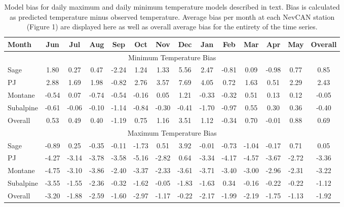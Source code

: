 \documentclass{ametsoc}
\begin{document}
\begin{table}[t]
\caption{Model bias for daily maximum and daily minimum temperature models described in text. Bias is calculated as predicted temperature minus observed temperature. Average bias per month at each NevCAN station (Figure 1) are displayed here as well as overall average bias for the entirety of the time series.}
\begin{center}
\begin{tabular}{lccccccccccccc}
\hline\hline
Month     & Jun   & Jul   & Aug   & Sep   & Oct   & Nov   & Dec   & Jan   & Feb   & Mar   & Apr   & May   & Overall \\
\hline
\multicolumn{14}{c}{Minimum Temperature Bias}                                                                       \\
Sage      & 1.80  & 0.27  & 0.47  & -2.24 & 1.24  & 1.33  & 5.56  & 2.47  & -0.81 & 0.09  & -0.98 & 0.77  & 0.85    \\
PJ        & 2.88  & 1.69  & 1.98  & -0.82 & 2.76  & 3.57  & 7.69  & 4.05  & 0.72  & 1.63  & 0.51  & 2.29  & 2.43    \\
Montane   & -0.54 & 0.07  & -0.74 & -0.54 & -0.16 & 0.05  & 1.21  & -0.33 & -0.32 & 0.51  & 0.13  & 0.12  & -0.05   \\
Subalpine & -0.61 & -0.06 & -0.10 & -1.14 & -0.84 & -0.30 & -0.41 & -1.70 & -0.97 & 0.55  & 0.30  & 0.36  & -0.40   \\
Overall   & 0.53  & 0.49  & 0.40  & -1.19 & 0.75  & 1.16  & 3.51  & 1.12  & -0.34 & 0.70  & -0.01 & 0.88  & 0.69    \\
\multicolumn{14}{c}{Maximum Temperature Bias}                                                                       \\
Sage      & -0.89 & 0.25  & -0.35 & -0.11 & -1.73 & 0.51  & 3.92  & -0.01 & -0.73 & -1.04 & -0.17 & 0.71  & 0.05    \\
PJ        & -4.27 & -3.14 & -3.78 & -3.58 & -5.16 & -2.82 & 0.64  & -3.34 & -4.17 & -4.57 & -3.67 & -2.72 & -3.36   \\
Montane   & -4.75 & -3.10 & -3.86 & -2.40 & -3.37 & -2.33 & -3.61 & -3.71 & -3.40 & -3.00 & -2.96 & -2.31 & -3.22   \\
Subalpine & -3.55 & -1.55 & -2.36 & -0.32 & -1.62 & -0.05 & -1.83 & -1.63 & 0.34  & -0.16 & -0.22 & -0.22 & -1.12   \\
Overall   & -3.20 & -1.88 & -2.59 & -1.60 & -2.97 & -1.17 & -0.22 & -2.17 & -1.99 & -2.19 & -1.75 & -1.13 & -1.92   \\
\hline  
\end{tabular}
\end{center}
\end{table}
\end{document}
